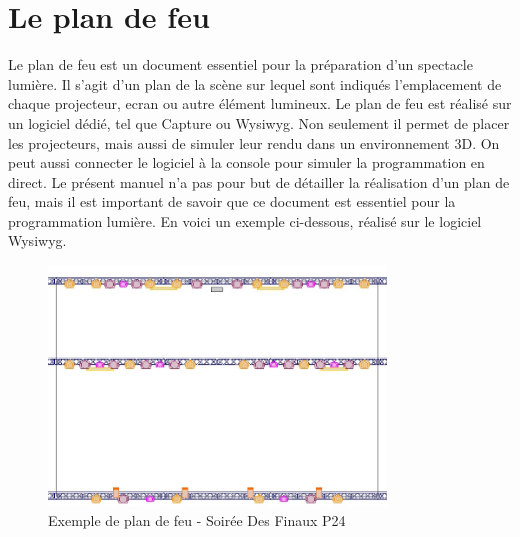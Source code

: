 \section{Le plan de feu}
\label{sec:plan_de_feu}

Le plan de feu est un document essentiel pour la préparation d'un spectacle lumière.
Il s'agit d'un plan de la scène sur lequel sont indiqués l'emplacement de chaque projecteur, ecran ou autre élément lumineux.
Le plan de feu est réalisé sur un logiciel dédié, tel que Capture ou Wysiwyg. Non seulement il permet de placer les projecteurs, mais aussi de simuler leur rendu dans un environnement 3D.
On peut aussi connecter le logiciel à la console pour simuler la programmation en direct.
\newline
Le présent manuel n'a pas pour but de détailler la réalisation d'un plan de feu, mais il est important de savoir que ce document est essentiel pour la programmation lumière.
En voici un exemple ci-dessous, réalisé sur le logiciel Wysiwyg.

\begin{figure}[h]
    \centering
    \includegraphics[width=0.8\textwidth]{2 - Généralités/Images/plan_de_feu.jpg}
    \caption{Exemple de plan de feu - Soirée Des Finaux P24}
    \label{fig:plan_de_feu}
\end{figure}
